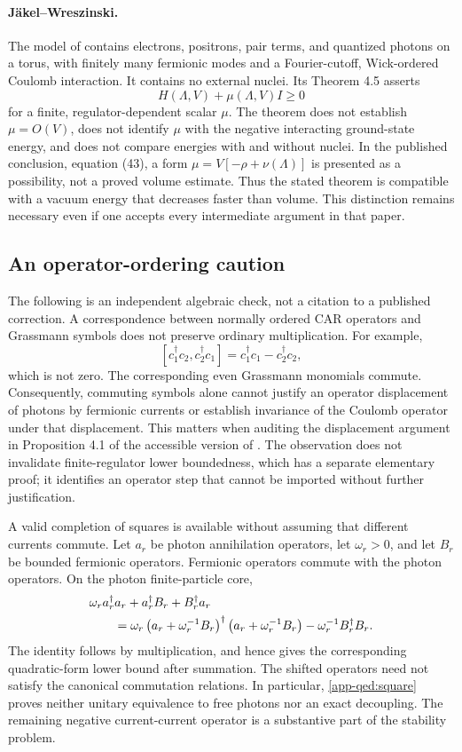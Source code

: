 \paragraph{J\"akel--Wreszinski.}
The model of \cite{JW2018} contains electrons, positrons, pair terms, and quantized photons on a torus, with finitely many fermionic modes and a Fourier-cutoff, Wick-ordered Coulomb interaction. It contains no external nuclei. Its Theorem 4.5 asserts
\[
 H(\Lambda,V)+\mu(\Lambda,V)I\geq0
\]
for a finite, regulator-dependent scalar \(\mu\). The theorem does not establish \(\mu=O(V)\), does not identify \(\mu\) with the negative interacting ground-state energy, and does not compare energies with and without nuclei. In the published conclusion, equation (43), a form \(\mu=V[-\rho+\nu(\Lambda)]\) is presented as a possibility, not a proved volume estimate. Thus the stated theorem is compatible with a vacuum energy that decreases faster than volume. This distinction remains necessary even if one accepts every intermediate argument in that paper.

\subsection{An operator-ordering caution}
\label{app-qed:ordering}

The following is an independent algebraic check, not a citation to a published correction. A correspondence between normally ordered CAR operators and Grassmann symbols does not preserve ordinary multiplication. For example,
\[
 [c_1^\dagger c_2,c_2^\dagger c_1]
 =c_1^\dagger c_1-c_2^\dagger c_2,
\]
which is not zero. The corresponding even Grassmann monomials commute. Consequently, commuting symbols alone cannot justify an operator displacement of photons by fermionic currents or establish invariance of the Coulomb operator under that displacement. This matters when auditing the displacement argument in Proposition 4.1 of the accessible version of \cite{JW2018}. The observation does not invalidate finite-regulator lower boundedness, which has a separate elementary proof; it identifies an operator step that cannot be imported without further justification.

A valid completion of squares is available without assuming that different currents commute. Let \(a_r\) be photon annihilation operators, let \(\omega_r>0\), and let \(B_r\) be bounded fermionic operators. Fermionic operators commute with the photon operators. On the photon finite-particle core,
\begin{align}
 &\omega_r a_r^\dagger a_r+a_r^\dagger B_r+B_r^\dagger a_r\notag\\
 &\qquad=\omega_r\left(a_r+\omega_r^{-1}B_r\right)^\dagger
                 \left(a_r+\omega_r^{-1}B_r\right)
          -\omega_r^{-1}B_r^\dagger B_r.
 \label{app-qed:square}
\end{align}
The identity follows by multiplication, and hence gives the corresponding quadratic-form lower bound after summation. The shifted operators need not satisfy the canonical commutation relations. In particular, \eqref{app-qed:square} proves neither unitary equivalence to free photons nor an exact decoupling. The remaining negative current-current operator is a substantive part of the stability problem.

